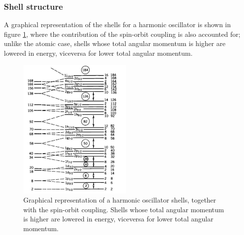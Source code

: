 \subsubsection{Shell structure}
A graphical representation of the shells for a harmonic oscillator is shown in figure \ref{fig:shell_model}, where the contribution of the spin-orbit coupling is also accounted for; unlike the atomic case, shells whose total angular momentum is higher are lowered in energy, viceversa for lower total angular momentum.  
\begin{figure}[h]
    \centering
    \includegraphics[width=0.5\textwidth]{Images/ShellModel.png}
    \caption{Graphical representation of a harmonic oscillator shells, together with the spin-orbit coupling. Shells whose total angular momentum is higher are lowered in energy, viceversa for lower total angular momentum.}
    \label{fig:shell_model}
\end{figure}


